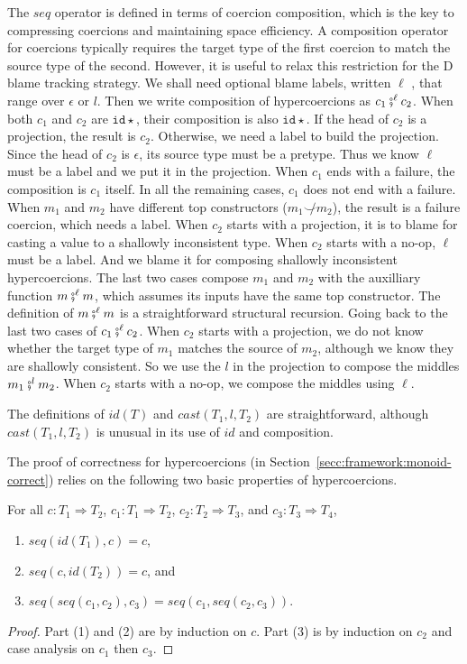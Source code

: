 \documentclass[acmsmall,review,anonymous]{acmart}\settopmatter{printfolios=true,printccs=false,printacmref=false}
\newcommand{\lazyD}{Lazy\;D}
\newcommand{\hyperCoercionI}[0]{\mathtt{id\star}}
\begin{document}
The $seq$ operator is defined in terms of coercion composition, which
is the key to compressing coercions and maintaining space efficiency.
A composition operator for coercions typically requires the target
type of the first coercion to match the source type of the second.
However, it is useful to relax this restriction for the D blame
tracking strategy.
%
We shall need optional blame labels, written $\ell$ , that range over
$\epsilon$ or $l$. Then we write composition of hypercoercions as $c_1
\fatsemi^\ell c_2$.  When both $c_1$ and $c_2$ are $\hyperCoercionI$,
their composition is also $\hyperCoercionI$.  If the head of $c_2$ is
a projection, the result is $c_2$.  Otherwise, we need a label to
build the projection. Since the head of $c_2$ is $\epsilon$, its
source type must be a pretype. Thus we know $\ell$ must be a label and
we put it in the projection. When $c_1$ ends with a failure, the
composition is $c_1$ itself. In all the remaining cases, $c_1$ does
not end with a failure.  When $m_1$ and $m_2$ have different top
constructors ($m_1 \not\smile m_2$), the result is a failure coercion,
which needs a label. When $c_2$ starts with a projection, it is to
blame for casting a value to a shallowly inconsistent type. When $c_2$
starts with a no-op, $\ell$ must be a label. And we blame it for
composing shallowly inconsistent hypercoercions. The last two cases
compose $m_1$ and $m_2$ with the auxilliary function $m \fatsemi^\ell
m$, which assumes its inputs have the same top constructor. The
definition of $m \fatsemi^\ell m$ is a straightforward structural
recursion. Going back to the last two cases of $c_1 \fatsemi^\ell
c_2$. When $c_2$ starts with a projection, we do not know whether the
target type of $m_1$ matches the source of $m_2$, although we know
they are shallowly consistent. So we use the $l$ in the projection to
compose the middles $m_1 \fatsemi^l m_2$. When $c_2$ starts with a
no-op, we compose the middles using $\ell$.

The definitions of $id(T)$ and $cast(T_1,l,T_2)$ are straightforward,
although $cast(T_1,l,T_2)$ is unusual in its use of $id$ and
composition.

The proof of correctness for hypercoercions (in
Section~\ref{secc:framework:monoid-correct}) relies on the following
two basic properties of hypercoercions.

\begin{proposition}[\lazyD\ hypercoercions form a monoid]
  \label{thm:hc-monoid}
  For all $c : T_1 \Longrightarrow T_2$,
  $c_1 : T_1 \Longrightarrow T_2$,
  $c_2 : T_2 \Longrightarrow T_3$, and
  $c_3 : T_3 \Longrightarrow T_4$,
  \begin{enumerate}
    \item $seq(id(T_1),c) = c$,
    \item $seq(c,id(T_2)) = c$, and
    \item $seq(seq(c_1, c_2), c_3) = seq(c_1, seq(c_2, c_3))$.
  \end{enumerate}
\end{proposition}
\begin{proof}
  Part (1) and (2) are by induction on $c$. Part (3) is by induction
  on $c_2$ and case analysis on $c_1$ then $c_3$.
\end{proof}
\end{document}
